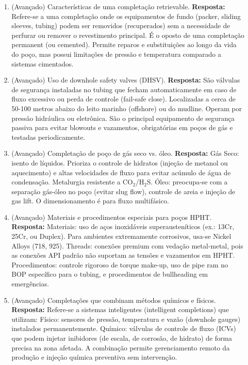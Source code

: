 \documentclass[11pt,a4paper]{article}
\begin{document}
\begin{enumerate}
  \item (Avançado) Características de uma completação retrievable.
  \textbf{Resposta:} Refere-se a uma completação onde os equipamentos de fundo (packer, sliding sleeves, tubing) podem ser removidos (recuperados) sem a necessidade de perfurar ou remover o revestimento principal. É o oposto de uma completação permanent (ou cemented). Permite reparos e substituições ao longo da vida do poço, mas possui limitações de pressão e temperatura comparado a sistemas cimentados.

  \item (Avançado) Uso de downhole safety valves (DHSV).
  \textbf{Resposta:} São válvulas de segurança instaladas no tubing que fecham automaticamente em caso de fluxo excessivo ou perda de controle (fail-safe close). Localizadas a cerca de 50-100 metros abaixo do leito marinho (offshore) ou do mudline. Operam por pressão hidráulica ou eletrônica. São o principal equipamento de segurança passiva para evitar blowouts e vazamentos, obrigatórias em poços de gás e testadas periodicamente.

  \item (Avançado) Completação de poço de gás seco vs. óleo.
  \textbf{Resposta:} Gás Seco: isento de líquidos. Prioriza o controle de hidratos (injeção de metanol ou aquecimento) e altas velocidades de fluxo para evitar acúmulo de água de condensação. Metalurgia resistente a CO$_2$/H$_2$S. Óleo: preocupa-se com a separação gás-óleo no poço (evitar slug flow), controle de areia e injeção de gas lift. O dimensionamento é para fluxo multifásico.

  \item (Avançado) Materiais e procedimentos especiais para poços HPHT.
  \textbf{Resposta:} Materiais: uso de aços inoxidáveis superausteníticos (ex.: 13Cr, 25Cr, ou Duplex). Para ambientes extremamente corrosivos, usa-se Nickel Alloys (718, 925). Threads: conexões premium com vedação metal-metal, pois as conexões API padrão não suportam as tensões e vazamentos em HPHT. Procedimentos: controle rigoroso de torque make-up, uso de pipe ram no BOP específico para o tubing, e procedimentos de bullheading em emergências.

  \item (Avançado) Completações que combinam métodos químicos e físicos.
  \textbf{Resposta:} Refere-se a sistemas inteligentes (intelligent completions) que utilizam: Físico: sensores de pressão, temperatura e vazão (downhole gauges) instalados permanentemente. Químico: válvulas de controle de fluxo (ICVs) que podem injetar inibidores (de escala, de corrosão, de hidrato) de forma precisa na zona afetada. A combinação permite gerenciamento remoto da produção e injeção química preventiva sem intervenção.


\end{enumerate}
\end{document}
